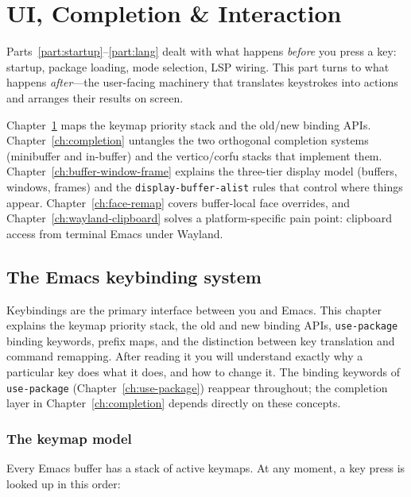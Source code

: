 \part{UI, Completion \& Interaction}
\label{part:ui}

Parts~\ref{part:startup}--\ref{part:lang} dealt with what happens
\emph{before} you press a key: startup, package loading, mode
selection, LSP wiring.  This part turns to what happens
\emph{after}---the user-facing machinery that translates keystrokes
into actions and arranges their results on screen.

Chapter~\ref{ch:keybindings} maps the keymap priority stack and the
old/new binding APIs.  Chapter~\ref{ch:completion} untangles the two
orthogonal completion systems (minibuffer and in-buffer) and the
vertico/corfu stacks that implement them.
Chapter~\ref{ch:buffer-window-frame} explains the three-tier display
model (buffers, windows, frames) and the
\texttt{display-buffer-alist} rules that control where things appear.
Chapter~\ref{ch:face-remap} covers buffer-local face overrides, and
Chapter~\ref{ch:wayland-clipboard} solves a platform-specific pain
point: clipboard access from terminal Emacs under Wayland.

\chapter{The Emacs keybinding system}
\label{ch:keybindings}
\minitoc\label{the-emacs-keybinding-system}

Keybindings are the primary interface between you and Emacs.  This
chapter explains the keymap priority stack, the old and new binding
APIs, \texttt{use-package} binding keywords, prefix maps, and the
distinction between key translation and command remapping.  After reading it you will understand exactly why a particular key
does what it does, and how to change it.  The binding keywords of
\texttt{use-package} (Chapter~\ref{ch:use-package}) reappear
throughout; the completion layer in Chapter~\ref{ch:completion}
depends directly on these concepts.

\section{The keymap model}\label{the-keymap-model}

Every Emacs buffer has a stack of active keymaps. At any moment, a key press is looked up in this order:

